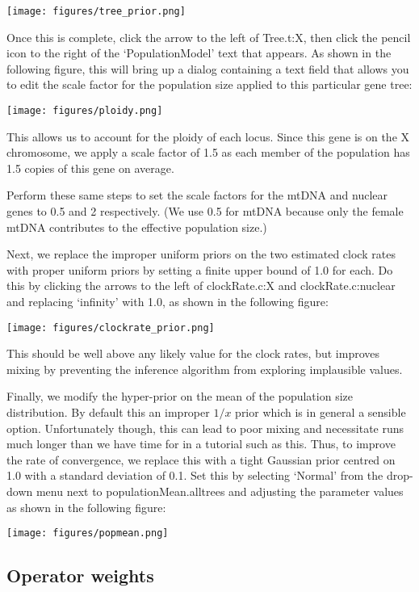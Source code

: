 \documentclass[a4paper,11pt]{article}
\begin{document}
\texttt{[image: figures/tree\_prior.png]}

Once this is complete, click the arrow to the left of Tree.t:X, then click the
pencil icon to the right of the `PopulationModel' text that appears. As shown
in the following figure, this will bring up a dialog containing a text
field that allows you to edit the scale factor for the population size applied
to this particular gene tree:

\texttt{[image: figures/ploidy.png]}

This allows us to account for the ploidy of each locus. Since this gene is on
the X chromosome, we apply a scale factor of 1.5 as each member of the
population has 1.5 copies of this gene on average.

Perform these same steps to set the scale factors for the mtDNA and nuclear
genes to 0.5 and 2 respectively. (We use 0.5 for mtDNA because only the female
mtDNA contributes to the effective population size.)

Next, we replace the improper uniform priors on the two estimated clock rates
with proper uniform priors by setting a finite upper bound of 1.0 for each.  Do
this by clicking the arrows to the left of clockRate.c:X and
clockRate.c:nuclear and replacing `infinity' with 1.0, as shown in
the following figure:

\texttt{[image: figures/clockrate\_prior.png]}

This should be well above any likely value for the
clock rates, but improves mixing by preventing the inference algorithm from
exploring implausible values.

Finally, we modify the hyper-prior on the mean of the population size
distribution. By default this an improper $1/x$ prior which is in general a
sensible option. Unfortunately though, this can lead to poor mixing and
necessitate runs much longer than we have time for in a tutorial such as this.
Thus, to improve the rate of convergence, we replace this with a tight Gaussian
prior centred on 1.0 with a standard deviation of 0.1. Set this by selecting
`Normal' from the drop-down menu next to populationMean.alltrees and adjusting
the parameter values as shown in the following figure:

\texttt{[image: figures/popmean.png]}

\subsection{Operator weights}
\end{document}
